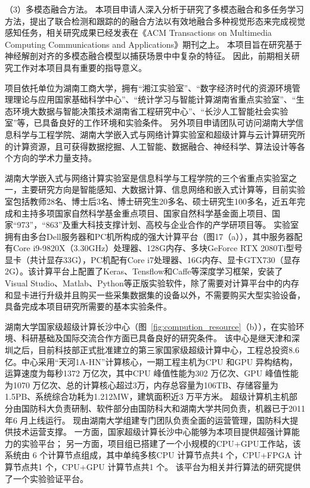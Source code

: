 \documentclass[a4paper,zihao=-4]{article}
\begin{document}
（3）多模态融合方法。
本项目申请人深入分析于研究了多模态融合和多任务学习方法，提出了联合检测和跟踪的的融合方法以有效地融合多种视觉形态来完成视觉感知任务，相关研究成果已经发表在《ACM Transactions on Multimedia
Computing Communications and Applications》期刊之上。
本项目旨在研究基于神经解剖对齐的多模态融合模型以捕获场景中中复杂的特征。
因此，前期相关研究工作对本项目具有重要的指导意义。





项目依托单位为湖南工商大学，拥有“湘江实验室”、“数字经济时代的资源环境管理理论与应用国家基础科学中心”、“统计学习与智能计算湖南省重点实验室”、“生态环境大数据与智能决策技术湖南省工程研究中心”、“长沙人工智能社会实验室”等，已具备良好的工作环境和实验条件。
另外项目申请团队可访问湖南大学信息科学与工程学院、湖南大学嵌入式与网络计算实验室和超级计算与云计算研究所的计算资源，且可获得数据挖掘、人工智能、数据融合、神经科学、算法设计等各个方向的学术力量支持。

湖南大学嵌入式与网络计算实验室是信息科学与工程学院的三个省重点实验室之一，主要研究方向是智能感知、大数据计算、信息网络和嵌入式计算等，目前实验室包括教师28名、博士后3名、博士研究生20多名、硕士研究生100多名，近五年完成和主持多项国家自然科学基金重点项目、国家自然科学基金面上项目、国家“973”，“863”及重大科技支撑计划、高校与企业合作的产学研项目等。
实验室拥有由多台Dell服务器和PC机所构成的强大计算平台（图17（a）），其中服务器配有Core i9-9820X（3.30GHz）处理器、128G内存、多块GeForce RTX 2080Ti型号显卡（共计显存33G），PC机配有Core i7处理器、16G内存、显卡GTX730（显存2G）。该计算平台上配置了Keras、Tensflow和Caffe等深度学习框架，安装了Visual Studio、Matlab、Python等正版实验软件，除了需要对计算平台中的内存和显卡进行升级并且购买一些采集数据集的设备以外，不需要购买大型实验设备，具备完成本项目研究所需要的基本实验条件。


湖南大学国家级超级计算长沙中心（图~\ref{fig:compution_resource}（b）），在实验环境、科研基础及国际交流合作方面已具备良好的研究条件。
该中心是继天津和深圳之后，目前科技部正式批准建立的第三家国家级超级计算中心，工程总投资8.6 亿。中心采用“天河1A-HN”计算核心，一期工程主机为CPU 和GPU 异构结构，运算速度为每秒1372 万亿次，其中CPU 峰值性能为302 万亿次、GPU 峰值性能为1070 万亿次、总的计算核心超过3万，内存总容量为106TB、存储容量为1.5PB、系统综合功耗为1.212MW，建筑面积近3 万平方米。
超级计算机主机部分由国防科大负责研制、软件部分由国防科大和湖南大学共同负责，机器已于2011 年6 月上线运行。
现由湖南大学组建专门团队负责全面的运营管理，国防科大提供技术运营支撑。
一方面，国家超级计算长沙中心能够为本项目提供超强计算能力的实验平台；
另一方面，项目组已搭建了一个小规模的CPU+GPU工作站，该系统由 6 个计算节点组成，其中单纯多核CPU 计算节点共4 个，CPU+FPGA 计算节点共1 个，CPU+GPU 计算节点共1 个。
该平台为相关并行算法的研究提供了一个实验验证平台。
\end{document}
